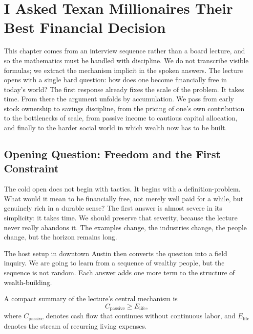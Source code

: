 \chapter{I Asked Texan Millionaires Their Best Financial Decision}

This chapter comes from an interview sequence rather than a board lecture, and so the mathematics must be handled with discipline. We do not transcribe visible formulas; we extract the mechanism implicit in the spoken answers. The lecture opens with a single hard question: how does one become financially free in today's world? The first response already fixes the scale of the problem. It takes time. From there the argument unfolds by accumulation. We pass from early stock ownership to savings discipline, from the pricing of one's own contribution to the bottlenecks of scale, from passive income to cautious capital allocation, and finally to the harder social world in which wealth now has to be built.

\section{Opening Question: Freedom and the First Constraint}

The cold open does not begin with tactics. It begins with a definition-problem. What would it mean to be financially free, not merely well paid for a while, but genuinely rich in a durable sense? The first answer is almost severe in its simplicity: it takes time. We should preserve that severity, because the lecture never really abandons it. The examples change, the industries change, the people change, but the horizon remains long.

The host setup in downtown Austin then converts the question into a field inquiry. We are going to learn from a sequence of wealthy people, but the sequence is not random. Each answer adds one more term to the structure of wealth-building.

\begin{definition}
A compact summary of the lecture's central mechanism is
\begin{equation}
C_{\text{passive}} \ge E_{\text{life}},
\end{equation}
where $C_{\text{passive}}$ denotes cash flow that continues without continuous labor, and $E_{\text{life}}$ denotes the stream of recurring living expenses.
\end{definition}

